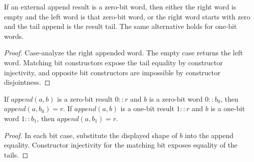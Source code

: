 \begin{theorem}
\label{thm:external-append-bit-result-inversion}
If an external append result is a zero-bit word, then either the right word is empty and the left word is that zero-bit word, or the right word starts with zero and the tail append is the result tail. The same alternative holds for one-bit words.
\end{theorem}
\begin{proof}
Case-analyze the right appended word. The empty case returns the left word. Matching bit constructors expose the tail equality by constructor injectivity, and opposite bit constructors are impossible by constructor disjointness.
\end{proof}

\begin{corollary}
\label{cor:external-append-bit-tail-equality}
If $append(a,b)$ is a zero-bit result $0::r$ and $b$ is a zero-bit word $0::b_0$, then $append(a,b_0)=r$. If $append(a,b)$ is a one-bit result $1::r$ and $b$ is a one-bit word $1::b_1$, then $append(a,b_1)=r$.
\end{corollary}
\begin{proof}
In each bit case, substitute the displayed shape of $b$ into the append equality. Constructor injectivity for the matching bit exposes equality of the tails.
\end{proof}
